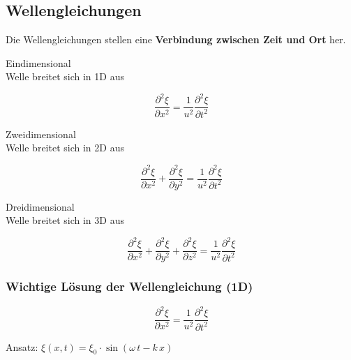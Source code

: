 \subsection{Wellengleichungen}

Die Wellengleichungen stellen eine \textbf{Verbindung zwischen Zeit und Ort} her.

\medskip
\begin{minipage}{0.45\columnwidth}
    Eindimensional \\
    Welle breitet sich in 1D aus
\end{minipage}
\hfill
\begin{minipage}{0.48\columnwidth}
    $$\boxed{ \frac{\partial^2 \xi}{\partial x^2} = \frac{1}{u^2} \frac{\partial^2 \xi}{\partial t^2}  }$$
\end{minipage}

\begin{minipage}{0.45\columnwidth}
    Zweidimensional \\
    Welle breitet sich in 2D aus
\end{minipage}
\hfill
\begin{minipage}{0.48\columnwidth}
    $$\boxed{ \frac{\partial^2 \xi}{\partial x^2} + \frac{\partial^2 \xi}{\partial y^2} = \frac{1}{u^2} \frac{\partial^2 \xi}{\partial t^2}  }$$
\end{minipage}

\begin{minipage}{0.45\columnwidth}
    Dreidimensional \\
    Welle breitet sich in 3D aus
\end{minipage}
\hfill
\begin{minipage}{0.48\columnwidth}
    $$\boxed{ \frac{\partial^2 \xi}{\partial x^2} + \frac{\partial^2 \xi}{\partial y^2} + \frac{\partial^2 \xi}{\partial z^2} = \frac{1}{u^2} \frac{\partial^2 \xi}{\partial t^2}  }$$
\end{minipage}


\subsubsection{Wichtige Lösung der Wellengleichung (1D)}

\begin{minipage}{0.38\columnwidth}
    $$\frac{\partial^2 \xi}{\partial x^2} = \frac{1}{u^2} \frac{\partial^2 \xi}{\partial t^2} $$
\end{minipage}
\hfill
\begin{minipage}{0.58\columnwidth}
    Ansatz: $\xi(x,t) = \xi_0 \cdot \sin(\omega \, t - k \, x)$
\end{minipage}

